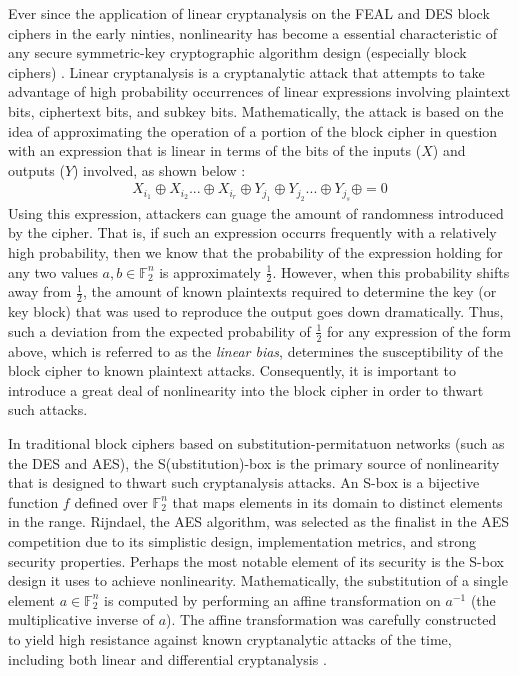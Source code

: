 \documentclass[11pt]{article}
\newcommand{\field}[1]{\mathbb{#1}} %
\begin{document}
Ever since the application of linear cryptanalysis on the FEAL and DES block ciphers in the early ninties, nonlinearity has become a essential characteristic of any secure symmetric-key cryptographic algorithm design (especially block ciphers) \cite{Heys01atutorial}. Linear cryptanalysis is a cryptanalytic attack that attempts to take advantage of high probability occurrences of linear expressions involving plaintext bits, ciphertext bits, and subkey bits. Mathematically, the attack is based on the idea of approximating the operation of a portion of the block cipher in question with an expression that is linear in terms of the bits of the inputs ($X$) and outputs ($Y$) involved, as shown below \cite{Heys01atutorial}:
\begin{eqnarray*}
X_{i_{1}} \oplus X_{i_{2}} ... \oplus X_{i_{r}} \oplus Y_{j_{1}} \oplus Y_{j_{2}} ... \oplus Y_{j_{s}} \oplus  = 0
\end{eqnarray*}
Using this expression, attackers can guage the amount of randomness introduced by the cipher. That is, if such an expression occurrs frequently with a relatively high probability, then we know that the probability of the expression holding for any two values $a,b\in \field{F}_2^n$ is approximately $\frac{1}{2}$. However, when this probability shifts away from $\frac{1}{2}$, the amount of known plaintexts required to determine the key (or key block) that was used to reproduce the output goes down dramatically. Thus, such a deviation from the expected probability of $\frac{1}{2}$ for any expression of the form above, which is referred to as the \emph{linear bias}, determines the susceptibility of the block cipher to known plaintext attacks. Consequently, it is important to introduce a great deal of nonlinearity into the block cipher in order to thwart such attacks.

In traditional block ciphers based on substitution-permitatuon networks (such as the DES and AES), the S(ubstitution)-box is the primary source of nonlinearity that is designed to thwart such cryptanalysis attacks. An S-box is a bijective function $f$ defined over $\field{F}_2^n$ that maps elements in its domain to distinct elements in the range. Rijndael, the AES algorithm, was selected as the finalist in the AES competition due to its simplistic design, implementation metrics, and strong security properties. Perhaps the most notable element of its security is the S-box design it uses to achieve nonlinearity. Mathematically, the substitution of a single element $a \in \field{F}_2^n$ is computed by performing an affine transformation on $a^{-1}$ (the multiplicative inverse of $a$). The affine transformation was carefully constructed to yield high resistance against known cryptanalytic attacks of the time, including both linear and differential cryptanalysis \cite{Daemen:2002:DRA}. 
\end{document}
